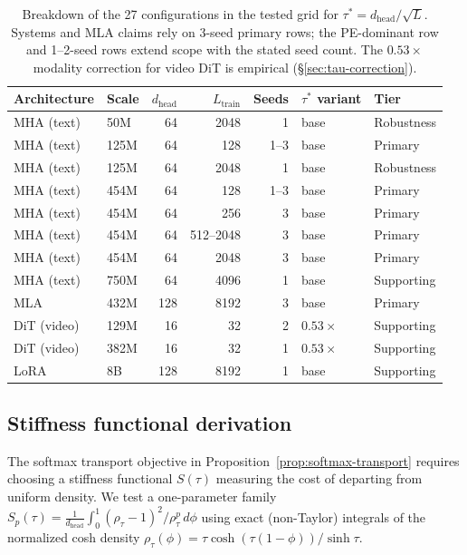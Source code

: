 \begin{table}[ht]
\caption{Breakdown of the 27 configurations in the tested grid for $\tau^* = d_{\mathrm{head}}/\sqrt{L}$. Systems and MLA claims rely on 3-seed primary rows; the PE-dominant row and 1--2-seed rows extend scope with the stated seed count. The $0.53\times$ modality correction for video DiT is empirical (\S\ref{sec:tau-correction}).}
\label{tab:config-breakdown}
\centering
\small
\begin{tabular}{@{}l l r r r l l@{}}
\toprule
Architecture & Scale & $d_{\mathrm{head}}$ & $L_{\mathrm{train}}$ & Seeds & $\tau^*$ variant & Tier \\
\midrule
MHA (text) & 50M & 64 & 2048 & 1 & base & Robustness \\
MHA (text) & 125M & 64 & 128 & 1--3 & base & Primary \\
MHA (text) & 125M & 64 & 2048 & 1 & base & Robustness \\
MHA (text) & 454M & 64 & 128 & 1--3 & base & Primary \\
MHA (text) & 454M & 64 & 256 & 3 & base & Primary \\
MHA (text) & 454M & 64 & 512--2048 & 3 & base & Primary \\
MHA (text) & 454M & 64 & 2048 & 3 & base & Primary \\
MHA (text) & 750M & 64 & 4096 & 1 & base & Supporting \\
\midrule
MLA & 432M & 128 & 8192 & 3 & base & Primary \\
\midrule
DiT (video) & 129M & 16 & 32 & 2 & $0.53\times$ & Supporting \\
DiT (video) & 382M & 16 & 32 & 1 & $0.53\times$ & Supporting \\
\midrule
LoRA & 8B & 128 & 8192 & 1 & base & Supporting \\
\bottomrule
\end{tabular}
\end{table}

\subsection{Stiffness functional derivation}
\label{sec:stiffness-derivation}

The softmax transport objective in Proposition~\ref{prop:softmax-transport} requires choosing a stiffness functional $S(\tau)$ measuring the cost of departing from uniform density. We test a one-parameter family $S_p(\tau) = \frac{1}{d_{\mathrm{head}}}\int_0^1 (\rho_\tau - 1)^2/\rho_\tau^p\,d\phi$ using exact (non-Taylor) integrals of the normalized cosh density $\rho_\tau(\phi) = \tau\cosh(\tau(1{-}\phi))/\sinh\tau$.

